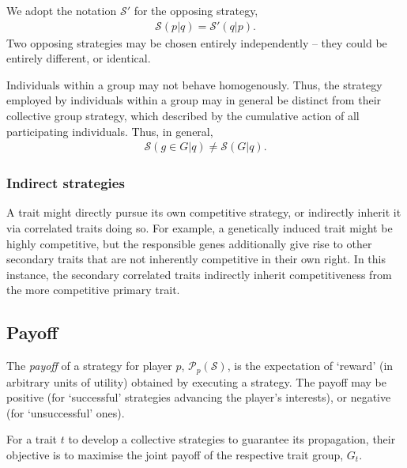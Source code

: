 \documentclass[aps,rmp,twocolumn,amsmath,amssymb,nofootinbib,superscriptaddress]{revtex4}
\begin{document}

We adopt the notation $\mathcal{S}'$ for the opposing strategy,
\begin{align}
	\mathcal{S}(p|q) = \mathcal{S}'(q|p).
\end{align}
Two opposing strategies may be chosen entirely independently -- they could be entirely different, or identical.

Individuals within a group may not behave homogenously. Thus, the strategy employed by individuals within a group may in general be distinct from their collective group strategy, which described by the cumulative action of all participating individuals. Thus, in general,
\begin{align}
	\mathcal{S}(g\in G|q)\neq \mathcal{S}(G|q).
\end{align}

\subsubsection{Indirect strategies}

A trait might directly pursue its own competitive strategy, or indirectly inherit it via correlated traits doing so. For example, a genetically induced trait might be highly competitive, but the responsible genes additionally give rise to other secondary traits that are not inherently competitive in their own right. In this instance, the secondary correlated traits indirectly inherit competitiveness from the more competitive primary trait.

\subsection{Payoff}

The \textit{payoff} of a strategy for player $p$, $\mathcal{P}_p(\mathcal{S})$, is the expectation of `reward' (in arbitrary units of utility) obtained by executing a strategy. The payoff may be positive (for `successful' strategies advancing the player's interests), or negative (for `unsuccessful' ones).

For a trait $t$ to develop a collective strategies to guarantee its propagation, their objective is to maximise the joint payoff of the respective trait group, $G_t$.
\end{document}
